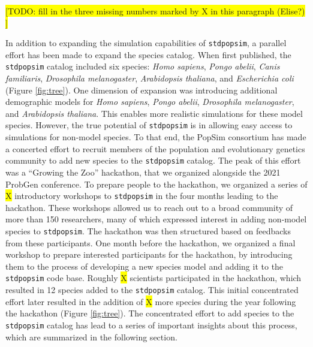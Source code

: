 \documentclass[hidelinks]{article}
\newcommand{\stdpopsim}{\texttt{stdpopsim}\xspace}
\begin{document}
\colorbox{yellow}{[TODO: fill in the three missing numbers marked by X in this paragraph (Elise?) ]}

In addition to expanding the simulation capabilities of \texttt{\stdpopsim}, a parallel effort has been made to expand the species catalog. When first
published, the \texttt{\stdpopsim} catalog included six species: \emph{Homo sapiens}, \emph{Pongo abelii}, \emph{Canis familiaris}, \emph{Drosophila melanogaster}, \emph{Arabidopsis thaliana}, and \emph{Escherichia coli} (Figure \ref{fig:tree}).
One dimension of expansion was introducing additional demographic models for \emph{Homo sapiens}, \emph{Pongo abelii}, \emph{Drosophila melanogaster}, and \emph{Arabidopsis thaliana}. This enables more realistic simulations for these model species. 
However, the true potential of \texttt{\stdpopsim} is in allowing easy access to simulations for non-model species. To that end, the PopSim consortium has made a concerted effort to recruit members of the population and evolutionary genetics community to add new species to the \stdpopsim catalog. The peak of this effort was a ``Growing the Zoo'' hackathon, that we organized alongside the 2021 ProbGen conference. To prepare people to the hackathon, we organized a series of \colorbox{yellow}{X} introductory workshops to \texttt{\stdpopsim} in the four months leading to the hackathon. These workshops allowed us to reach out to a broad community of more than 150 researchers, many of which expressed interest in adding non-model species to \texttt{\stdpopsim}. The hackathon was then structured based on feedbacks from these participants. One month before the hackathon, we organized a final workshop to prepare interested participants for the hackathon, by introducing them to  the process of developing a new species model and adding it to the \texttt{\stdpopsim}
code base. 
Roughly \colorbox{yellow}{X} scientists participated in the hackathon, which resulted in 12 species added to the \texttt{\stdpopsim} catalog.
This initial concentrated effort later resulted in the addition of \colorbox{yellow}{X} more species during the year following the hackathon (Figure \ref{fig:tree}).
The concentrated effort to add species to the \texttt{\stdpopsim} catalog has lead to a series of important insights about this process, which are summarized in the following section.
\end{document}
